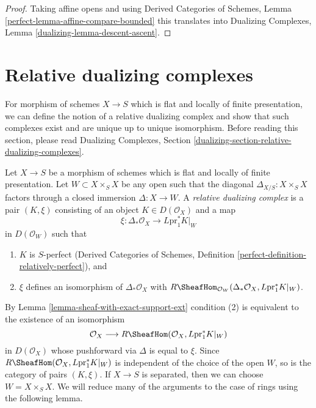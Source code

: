 \begin{proof}
Taking affine opens and using
Derived Categories of Schemes, Lemma \ref{perfect-lemma-affine-compare-bounded}
this translates into
Dualizing Complexes, Lemma \ref{dualizing-lemma-descent-ascent}.
\end{proof}




\section{Relative dualizing complexes}
\label{section-relative-dualizing-complexes}

\noindent
For morphism of schemes $X \to S$ which is flat and locally of finite
presentation, we can define the notion of a relative dualizing complex
and show that such complexes exist and are unique up to unique isomorphism.
Before reading this section, please read
Dualizing Complexes, Section
\ref{dualizing-section-relative-dualizing-complexes}.

\begin{definition}
\label{definition-relative-dualizing-complex}
Let $X \to S$ be a morphism of schemes which is flat and
locally of finite presentation. Let $W \subset X \times_S X$
be any open such that the diagonal $\Delta_{X/S} : X \times_S X$
factors through a closed immersion $\Delta : X \to W$.
A {\it relative dualizing complex} is a
pair $(K, \xi)$ consisting of an object $K \in D(\mathcal{O}_X)$
and a map
$$
\xi : \Delta_*\mathcal{O}_X \longrightarrow L\text{pr}_1^*K|_W
$$
in $D(\mathcal{O}_W)$ such that
\begin{enumerate}
\item $K$ is $S$-perfect (Derived Categories of Schemes, Definition
\ref{perfect-definition-relatively-perfect}), and
\item $\xi$ defines an isomorphism of $\Delta_*\mathcal{O}_X$
with
$R\SheafHom_{\mathcal{O}_W}(
\Delta_*\mathcal{O}_X, L\text{pr}_1^*K|_W)$.
\end{enumerate}
\end{definition}

\noindent
By Lemma \ref{lemma-sheaf-with-exact-support-ext} condition (2)
is equivalent to the existence of an isomorphism
$$
\mathcal{O}_X \longrightarrow
R\SheafHom(\mathcal{O}_X, L\text{pr}_1^*K|_W)
$$
in $D(\mathcal{O}_X)$ whose pushforward via $\Delta$ is equal to $\xi$.
Since $R\SheafHom(\mathcal{O}_X, L\text{pr}_1^*K|_W)$ is independent
of the choice of the open $W$, so is the category of pairs $(K, \xi)$.
If $X \to S$ is separated, then we can choose $W = X \times_S X$.
We will reduce many of the arguments to the case of rings
using the following lemma.


